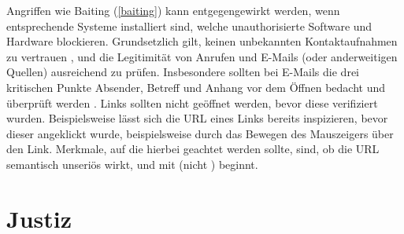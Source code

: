 Angriffen wie Baiting (\autoref{baiting}) kann entgegengewirkt werden, wenn entsprechende Systeme installiert sind, welche unauthorisierte Software und Hardware blockieren.
Grundsetzlich gilt, keinen unbekannten Kontaktaufnahmen zu vertrauen , und die Legitimität von Anrufen und E-Mails (oder anderweitigen Quellen) ausreichend zu prüfen.
Insbesondere sollten bei E-Mails die drei kritischen Punkte Absender, Betreff und Anhang vor dem Öffnen bedacht und überprüft werden .
Links sollten nicht geöffnet werden, bevor diese verifiziert wurden. Beispielsweise lässt sich die URL eines Links bereits inspizieren, bevor dieser angeklickt wurde, beispielsweise durch das Bewegen des Mauszeigers über den Link.
Merkmale, auf die hierbei geachtet werden sollte, sind, ob die URL semantisch unseriös wirkt, und mit  (nicht ) beginnt. 

\section{Justiz}

